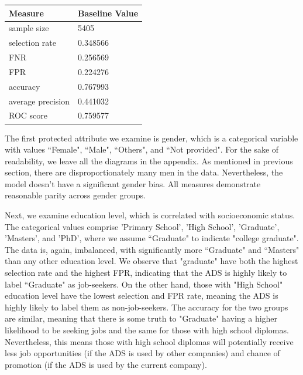 \begin{table}[h]
\centering
\begin{tabular}{ |p{3cm}||p{3cm}|}
 \hline
 Measure 		& Baseline Value\\
 \hline

sample size 	& 5405 \\

selection rate 	& 0.348566 \\

FNR 	& 0.256569\\

FPR & 0.224276 \\

accuracy		 & 0.767993 \\
average precision & 0.441032 \\
ROC score & 0.759577 \\

 \hline
\end{tabular}
\end{table}


The first protected attribute we examine is gender, which is a categorical variable with values ``Female", ``Male", ``Others", and ``Not provided". For the sake of readability, we leave all the diagrams in the appendix. As mentioned in previous section, there are disproportionately many men in the data. Nevertheless, the model doesn't have a significant gender bias. All measures demonstrate reasonable parity across gender groups.

Next, we examine education level, which is correlated with socioeconomic status. The categorical values comprise 'Primary School', 'High School', 'Graduate', 'Masters', and 'PhD', where we assume ``Graduate" to indicate "college graduate". The data is, again, imbalanced, with significantly more ``Graduate" and ``Masters" than any other education level. We observe that "graduate" have both the highest selection rate and the highest FPR, indicating that the ADS is highly likely to label ``Graduate" as job-seekers. On the other hand, those with "High School" education level have the lowest selection and FPR rate, meaning the ADS is highly likely to label them as non-job-seekers. The accuracy for the two groups are similar, meaning that there is some truth to "Graduate" having a higher likelihood to be seeking jobs and the same for those with high school diplomas. Nevertheless, this means those with high school diplomas will potentially receive less job opportunities (if the ADS is used by other companies) and chance of promotion (if the ADS is used by the current company).

